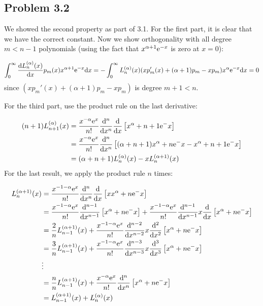 \documentclass[12pt,a4paper]{article}
\def\D{ {\rm d} }
\def\E{ {\rm e} }
\def\dx{\D x}
\def\br[#1]{\left[{#1}\right]}
\begin{document}
\subsection{Problem 3.2}
We showed the second property as part of 3.1. For the first part, it is clear that we have the correct constant. Now we show orthogonality with all degree $m < n-1$ polynomials (using the fact that $x^{\alpha+1} \E^{-x}$ is zero at $x = 0$):

\[
\int_0^\infty {\D L_n^{(\alpha)}(x) \over \dx} p_m(x) x^{\alpha+1} \E^{-x} \dx = -\int_0^\infty L_n^{(\alpha)}(x) (x p_m'(x) + (\alpha+1) p_m - x p_m) x^{\alpha} \E^{-x} \dx = 0
\]
since $(x p_m'(x) + (\alpha+1) p_m - x p_m) $ is degree $m+1 < n$.

For the third part, use the product rule on the last derivative:


\begin{align*}
(n+1) L_{n+1}^{(\alpha)}(x) &= {x^{-\alpha}\E^x \over n!} {\D^{n} \over \dx^{n}} {\D \over \dx} \br[x^{\alpha+n+1} \E^{-x}] \\
  &= {x^{-\alpha}\E^x \over n!} {\D^{n} \over \dx^{n}}  \br[(\alpha+n+1)x^{\alpha+n} \E^{-x}-x^{\alpha+n+1} \E^{-x}]  \\
    &= (\alpha+n+1)L_n^{(\alpha)}(x) -   xL_n^{(\alpha+1)}(x)
\end{align*}
For the last result, we apply the product rule $n$ times:


\begin{align*}
L_{n}^{(\alpha+1)}(x) &= {x^{-1-\alpha}\E^x \over n!} {\D^{n} \over \dx^{n}} {\D \over \dx} \br[x x^{\alpha+n} \E^{-x}] \\
&= {x^{-1-\alpha}\E^x \over n!} {\D^{n-1} \over \dx^{n-1}} \br[ x^{\alpha+n} \E^{-x}]  + {x^{-1-\alpha}\E^x \over n!} {\D^{n-1} \over \dx^{n-1}} x {\D \over \dx} \br[ x^{\alpha+n} \E^{-x}]  \\
&= {2 \over n}L_{n-1}^{(\alpha+1)}(x)   + {x^{-1-\alpha}\E^x \over n!} {\D^{n-2} \over \dx^{n-2}} x {\D^2 \over \dx^2} \br[ x^{\alpha+n} \E^{-x}]  \\
&= {3 \over n}L_{n-1}^{(\alpha+1)}(x)   + {x^{-1-\alpha}\E^x \over n!} {\D^{n-3} \over \dx^{n-3}} x {\D^3 \over \dx^3} \br[ x^{\alpha+n} \E^{-x}]  \\
&\vdots\\
&={n \over n}L_{n-1}^{(\alpha+1)}(x)   + {x^{-\alpha}\E^x \over n!} {\D^{n} \over \dx^{n}}  \br[ x^{\alpha+n} \E^{-x}] \\
&=L_{n-1}^{(\alpha+1)}(x) + L_n^{(\alpha)}(x)
\end{align*}
\end{document}
